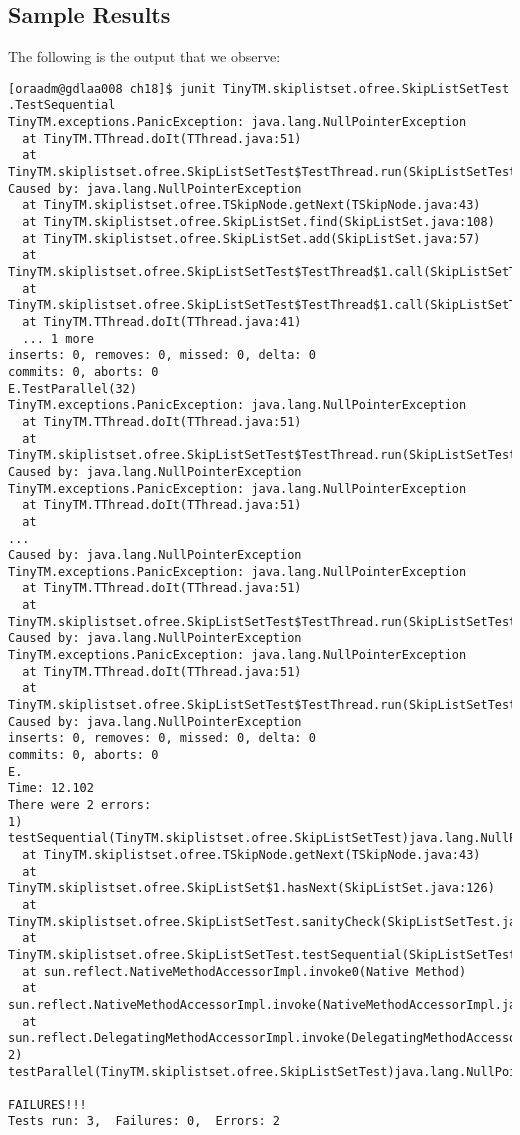 \subsection{Sample Results}
\par
The following is the output that we observe:
\par
\hfill
\begin{verbatim}
[oraadm@gdlaa008 ch18]$ junit TinyTM.skiplistset.ofree.SkipListSetTest
.TestSequential
TinyTM.exceptions.PanicException: java.lang.NullPointerException
  at TinyTM.TThread.doIt(TThread.java:51)
  at
TinyTM.skiplistset.ofree.SkipListSetTest$TestThread.run(SkipListSetTest.java:128)
Caused by: java.lang.NullPointerException
  at TinyTM.skiplistset.ofree.TSkipNode.getNext(TSkipNode.java:43)
  at TinyTM.skiplistset.ofree.SkipListSet.find(SkipListSet.java:108)
  at TinyTM.skiplistset.ofree.SkipListSet.add(SkipListSet.java:57)
  at
TinyTM.skiplistset.ofree.SkipListSetTest$TestThread$1.call(SkipListSetTest.java:130)
  at
TinyTM.skiplistset.ofree.SkipListSetTest$TestThread$1.call(SkipListSetTest.java:128)
  at TinyTM.TThread.doIt(TThread.java:41)
  ... 1 more
inserts: 0, removes: 0, missed: 0, delta: 0
commits: 0, aborts: 0
E.TestParallel(32)
TinyTM.exceptions.PanicException: java.lang.NullPointerException
  at TinyTM.TThread.doIt(TThread.java:51)
  at
TinyTM.skiplistset.ofree.SkipListSetTest$TestThread.run(SkipListSetTest.java:128)
Caused by: java.lang.NullPointerException
TinyTM.exceptions.PanicException: java.lang.NullPointerException
  at TinyTM.TThread.doIt(TThread.java:51)
  at
...
Caused by: java.lang.NullPointerException
TinyTM.exceptions.PanicException: java.lang.NullPointerException
  at TinyTM.TThread.doIt(TThread.java:51)
  at
TinyTM.skiplistset.ofree.SkipListSetTest$TestThread.run(SkipListSetTest.java:128)
Caused by: java.lang.NullPointerException
TinyTM.exceptions.PanicException: java.lang.NullPointerException
  at TinyTM.TThread.doIt(TThread.java:51)
  at
TinyTM.skiplistset.ofree.SkipListSetTest$TestThread.run(SkipListSetTest.java:128)
Caused by: java.lang.NullPointerException
inserts: 0, removes: 0, missed: 0, delta: 0
commits: 0, aborts: 0
E.
Time: 12.102
There were 2 errors:
1)
testSequential(TinyTM.skiplistset.ofree.SkipListSetTest)java.lang.NullPointerException
  at TinyTM.skiplistset.ofree.TSkipNode.getNext(TSkipNode.java:43)
  at TinyTM.skiplistset.ofree.SkipListSet$1.hasNext(SkipListSet.java:126)
  at
TinyTM.skiplistset.ofree.SkipListSetTest.sanityCheck(SkipListSetTest.java:181)
  at
TinyTM.skiplistset.ofree.SkipListSetTest.testSequential(SkipListSetTest.java:97)
  at sun.reflect.NativeMethodAccessorImpl.invoke0(Native Method)
  at
sun.reflect.NativeMethodAccessorImpl.invoke(NativeMethodAccessorImpl.java:57)
  at
sun.reflect.DelegatingMethodAccessorImpl.invoke(DelegatingMethodAccessorImpl.java:43)
2)
testParallel(TinyTM.skiplistset.ofree.SkipListSetTest)java.lang.NullPointerException

FAILURES!!!
Tests run: 3,  Failures: 0,  Errors: 2
\end{verbatim}

